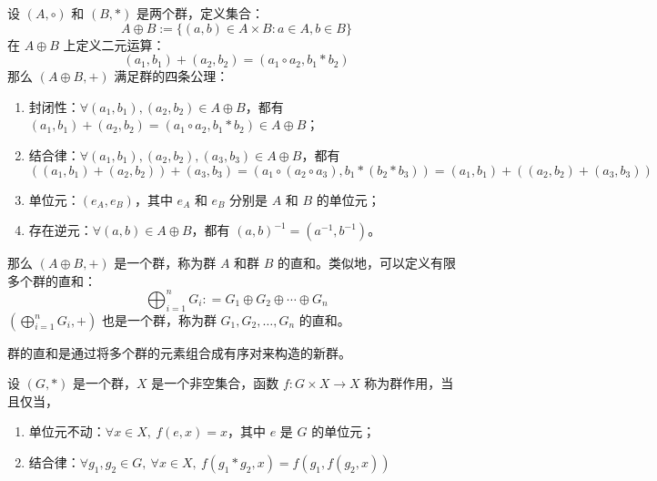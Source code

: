\begin{definition}
    设 $(A,\circ)$ 和 $(B,*)$ 是两个群，定义集合：
    \[
        A \oplus B := \{(a,b)\in A\times B:a\in A, b\in B\}
    \]
    在 $A \oplus B$ 上定义二元运算：
    \[
        (a_1,b_1) + (a_2,b_2) = (a_1 \circ a_2, b_1 * b_2)
    \]
    那么 $(A \oplus B, +)$ 满足群的四条公理：
    \begin{enumerate}
        \item 封闭性：$\forall (a_1,b_1), (a_2,b_2)\in A \oplus B$，都有 $(a_1,b_1) + (a_2,b_2) = (a_1 \circ a_2, b_1 * b_2) \in A \oplus B$；
        \item 结合律：$\forall (a_1,b_1), (a_2,b_2), (a_3,b_3)\in A \oplus B$，都有 
        \[
            ((a_1,b_1)  + (a_2,b_2)) + (a_3,b_3) = (a_1 \circ (a_2 \circ a_3), b_1 * (b_2 * b_3)) = (a_1,b_1) + ((a_2,b_2) + (a_3,b_3))
        \]
        \item 单位元：$(e_A, e_B)$，其中 $e_A$ 和 $e_B$ 分别是 $A$ 和 $B$ 的单位元；
        \item 存在逆元：$\forall (a,b)\in A \oplus B$，都有 $(a,b)^{-1} = (a^{-1}, b^{-1})$。
    \end{enumerate}
    那么 $(A \oplus B, +)$ 是一个群，称为群 $A$ 和群 $B$ 的直和。类似地，可以定义有限多个群的直和：
    \[
        \bigoplus^n_{i=1}G_i : = G_1\oplus G_2\oplus\cdots \oplus G_n
    \]
    $(\bigoplus^n_{i=1}G_i, +)$ 也是一个群，称为群 $G_1, G_2, \ldots, G_n$ 的直和。
    \label{def:group_direct_sum}
\end{definition}


\begin{note}
    群的直和是通过将多个群的元素组合成有序对来构造的新群。
\end{note}

\vspace{1em}

\begin{definition}
    设 $(G, *)$ 是一个群，$X$ 是一个非空集合，函数 $f:G\times X\to X$ 称为群作用，当且仅当，
    \begin{enumerate}
        \item 单位元不动：$\forall x\in X,\ f(e,x) = x$，其中 $e$ 是 $G$ 的单位元；
        \item 结合律：$\forall g_1, g_2\in G,\ \forall x\in X,\ f(g_1 * g_2, x) = f(g_1, f(g_2, x))$
    \end{enumerate}
    \label{def:group_action}
\end{definition}

